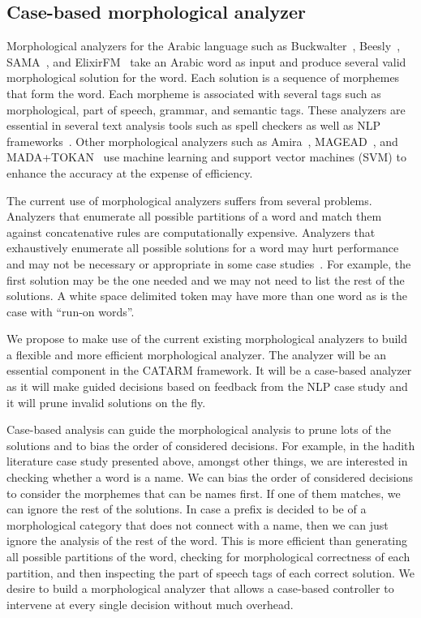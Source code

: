 \documentclass[12pt]{article}
\begin{document}
\subsection{Case-based morphological analyzer}

Morphological analyzers for the Arabic language
such as Buckwalter~\cite{Buckwalter:02},
Beesly~\cite{Beesley:01}, SAMA~\cite{Kulick:10},
and ElixirFM~\cite{Otakar:07} take an Arabic word as input
and produce several valid morphological solution for the word. 
Each solution is a sequence of morphemes that form the word.
Each morpheme is associated with several tags such as 
morphological, part of speech, grammar, and semantic tags. 
These analyzers are essential in several text analysis tools such 
as spell checkers as well as NLP frameworks~\cite{Col09}.
Other morphological analyzers such as 
Amira~\cite{Diab:07,Benajiba:07},
MAGEAD~\cite{Habash:05}, and MADA+TOKAN~\cite{Habash:09} 
use machine learning and support vector machines (SVM) 
to enhance the accuracy at the expense of efficiency.

The current use of morphological analyzers suffers from 
several problems. 
Analyzers that enumerate all possible partitions of a word
and match them against concatenative rules are computationally 
expensive. 
Analyzers that exhaustively enumerate all possible solutions 
for a word may hurt performance and may
not be necessary or appropriate in some case studies~\cite{Maamouri:10}. 
For example, the first solution may be the one needed and 
we may not need to list the rest of the solutions. 
A white space delimited token may have more than one word
as is the case with ``run-on words''.

We propose to make use of the current existing morphological
analyzers to build a flexible and more efficient
morphological analyzer. 
The analyzer will be an essential
component in the CATARM framework. 
It will be a case-based analyzer as it will make guided decisions
based on feedback from the NLP case study and it will prune
invalid solutions on the fly. 

Case-based analysis can guide the morphological analysis
to prune lots of the solutions and to bias the order of considered
decisions. 
For example, in the hadith literature case study presented above, 
amongst other things, we are interested in checking whether a 
word is a name.  
We can bias the order of considered decisions to consider the 
morphemes that can be names first. 
If one of them matches, we can ignore the rest of the solutions. 
In case a prefix is decided to be of a morphological category
that does not connect with a name, then we can just ignore
the analysis of the rest of the word. 
This is more efficient than generating all possible partitions
of the word, checking for morphological correctness of each 
partition, and then inspecting the part of speech tags of each
correct solution. 
We desire to build a morphological analyzer that allows a 
case-based controller to intervene at every single decision
without much overhead. 
\end{document}
